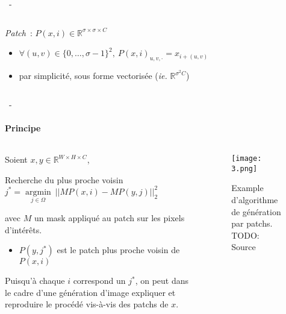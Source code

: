 \documentclass[aspectratio=169, 22pt]{beamer}
\DeclareMathOperator*{\argmin}{argmin}
\begin{document}
\begin{frame}{\secname~- \subsecname}
\begin{columns}
\begin{column}{0.55\linewidth}
      \vfill
      \emph{Patch} : $P(x,i) \in \mathbb{R}^{\sigma \times \sigma \times C}$
      \begin{itemize}
        \footnotesize 
        \item $\forall (u,v) \in \{0,\dots,\sigma-1\}^2,\ P(x,i)_{u, v, \cdot} =
          x_{i+(u,v)}$
        \item par simplicité, sous forme vectorisée (\emph{ie.} $\mathbb{R}^{\sigma^2 C}$)
      \end{itemize}      
    \end{column}
  \end{columns}  
\end{frame}

\begin{frame}{\secname~- \subsecname} 
  \framesubtitle{Principe}
  \begin{columns}
    \begin{column}{0.7\linewidth}
      Soient $x, y \in \mathbb{R}^{W \times H \times C}$,
      \begin{block}{Recherche du plus proche voisin}
        \centering
        $j^* = \underset{j \in \Omega}{\argmin}\ ||MP(x,i) - MP(y,j)||_2^2$
      \end{block}
      {\small avec $M$ un mask appliqué au patch sur les pixels d'intérêts.}

      \vfill
      \begin{itemize}
      \item $P(y,j^*)$ est le \alert{patch plus proche voisin} de $P(x,i)$        
      \end{itemize}
      \begin{exampleblock}{}
        \centering
        \small
        Puisqu'à chaque $i$ correspond un $j^*$, on peut dans le
        cadre d'une génération d'image \alert{expliquer} et \alert{reproduire}
        le procédé vis-à-vis des patchs de $x$.
      \end{exampleblock}
    \end{column}
    \begin{column}{0.3\linewidth}
      \begin{figure}
        \centering
        \texttt{[image: 3.png]}
        \caption{Example d'algorithme de génération par patchs. \alert{TODO: Source}}
      \end{figure}
    \end{column}
  \end{columns}
\end{frame}
\end{document}

